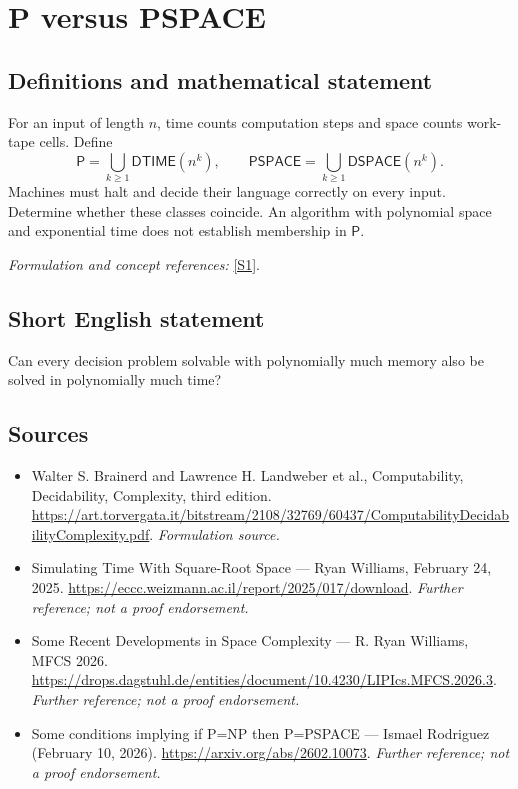 \documentclass[11pt]{article}
\begin{document}
\section*{\texorpdfstring{P versus PSPACE}{P versus PSPACE}}\label{14}
\subsection{Definitions and mathematical statement}
For an input of length $n$, time counts computation steps and space counts work-tape cells. Define
\[
 \mathsf P=\bigcup_{k\ge1}\mathsf{DTIME}(n^k),\qquad
 \mathsf{PSPACE}=\bigcup_{k\ge1}\mathsf{DSPACE}(n^k).
\]
Machines must halt and decide their language correctly on every input. Determine whether these classes coincide. An algorithm with polynomial space and exponential time does not establish membership in $\mathsf P$.
\par\smallskip\textit{Formulation and concept references:} \href{https://art.torvergata.it/bitstream/2108/32769/60437/ComputabilityDecidabilityComplexity.pdf}{[S1]}.

\subsection{Short English statement}
Can every decision problem solvable with polynomially much memory also be solved in polynomially much time?
\subsection{Sources}
\begin{itemize}
\item[S1]Walter S. Brainerd and Lawrence H. Landweber et al., Computability, Decidability, Complexity, third edition.
\url{https://art.torvergata.it/bitstream/2108/32769/60437/ComputabilityDecidabilityComplexity.pdf}.
\textit{Formulation source.}
\item[S2]Simulating Time With Square-Root Space — Ryan Williams, February 24, 2025.
\url{https://eccc.weizmann.ac.il/report/2025/017/download}.
\textit{Further reference; not a proof endorsement.}
\item[S3]Some Recent Developments in Space Complexity — R. Ryan Williams, MFCS 2026.
\url{https://drops.dagstuhl.de/entities/document/10.4230/LIPIcs.MFCS.2026.3}.
\textit{Further reference; not a proof endorsement.}
\item[S4]Some conditions implying if P=NP then P=PSPACE — Ismael Rodriguez (February 10, 2026).
\url{https://arxiv.org/abs/2602.10073}.
\textit{Further reference; not a proof endorsement.}
\end{itemize}
\end{document}
